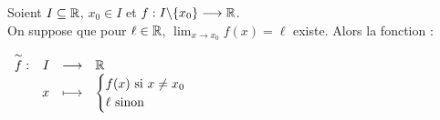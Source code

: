 \begin{definition}
	Soient $I \subseteq \mathbb{R}$, $x_0 \in I$ et $f : I\backslash\{x_0\} \longrightarrow \mathbb{R}$.
	\\
	On suppose que pour $\ell \in \mathbb{R}$, $\lim_{x \to x_0} f(x) = \ell$ existe. Alors la fonction :
	\begin{center}
		$
		\begin{array}{rrcl} \overset{\sim}{f} : & I & \longrightarrow & \mathbb{R} \\ & x & \longmapsto & 
		\begin{cases}
			f(x) \text{ si } x \neq x_0 \\
			\ell \text{ sinon}
		\end{cases}		
		 \end{array}
		$
	\end{center}
\end{definition}